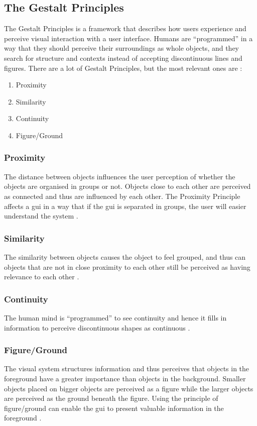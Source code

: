 \subsection{The Gestalt Principles}
\label{sec:gestaltprinciples}
The Gestalt Principles is a framework that describes how users experience and perceive visual interaction with a user interface. Humans are ``programmed'' in a way that they should perceive their surroundings as whole objects, and they search for structure and contexts instead of accepting discontinuous lines and figures. There are a lot of Gestalt Principles, but the most relevant ones are \cite{johnson}:
\begin{enumerate}
     \item Proximity
     \item Similarity
     \item Continuity
     \item Figure/Ground
 \end{enumerate}

\subsubsection{Proximity}
\label{sec:proximity}
The distance between objects influences the user perception of whether the objects are organised in groups or not. Objects close to each other are perceived as connected and thus are influenced by each other. The Proximity Principle affects a \acrfull{gui} in a way that if the \acrshort{gui} is separated in groups, the user will easier understand the system \cite{johnson}.

\subsubsection{Similarity}
\label{sec:similarity}
The similarity between objects causes the object to feel grouped, and thus can objects that are not in close proximity to each other still be perceived as having relevance to each other \cite{johnson}.

\subsubsection{Continuity}
\label{sec:continuity}
The human mind is ``programmed'' to see continuity and hence it fills in information to perceive discontinuous shapes as continuous \cite{johnson}.

\subsubsection{Figure/Ground}
\label{sec:figureground}
The visual system structures information and thus perceives that objects in the foreground have a greater importance than objects in the background. Smaller objects placed on bigger objects are perceived as a figure while the larger objects are perceived as the ground beneath the figure. Using the principle of figure/ground can enable the \acrshort{gui} to present valuable information in the foreground \cite{johnson}.